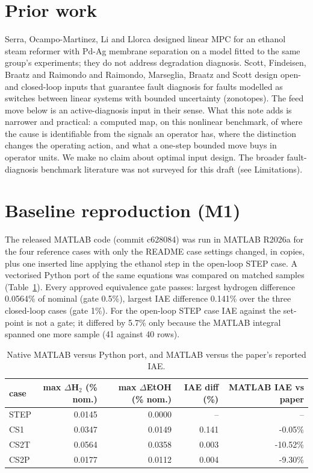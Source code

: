 \documentclass[10pt,a4paper]{article}
\begin{document}
\section{Prior work}
Serra, Ocampo-Martinez, Li and Llorca \cite{serra} designed linear MPC for an ethanol steam reformer with Pd-Ag membrane separation on a model fitted to the same group's experiments; they do not address degradation diagnosis. Scott, Findeisen, Braatz and Raimondo \cite{scott} and Raimondo, Marseglia, Braatz and Scott \cite{raimondo} design open- and closed-loop inputs that guarantee fault diagnosis for faults modelled as switches between linear systems with bounded uncertainty (zonotopes). The feed move below is an active-diagnosis input in their sense. What this note adds is narrower and practical: a computed map, on this nonlinear benchmark, of where the cause is identifiable from the signals an operator has, where the distinction changes the operating action, and what a one-step bounded move buys in operator units. We make no claim about optimal input design. The broader fault-diagnosis benchmark literature was not surveyed for this draft (see Limitations).

\section{Baseline reproduction (M1)}
The released MATLAB code (commit c628084) was run in MATLAB R2026a for the four reference cases with only the README case settings changed, in copies, plus one inserted line applying the ethanol step in the open-loop STEP case. A vectorised Python port of the same equations was compared on matched samples (Table~\ref{tab:m1}). Every approved equivalence gate passes: largest hydrogen difference 0.0564\% of nominal (gate 0.5\%), largest IAE difference 0.141\% over the three closed-loop cases (gate 1\%). For the open-loop STEP case IAE against the set-point is not a gate; it differed by 5.7\% only because the MATLAB integral spanned one more sample (41 against 40 rows).

\begin{table}[h]\centering\small
\caption{Native MATLAB versus Python port, and MATLAB versus the paper's reported IAE.}\label{tab:m1}
\begin{tabular}{lrrrr}\toprule
case & max $\Delta$H$_2$ (\% nom.) & max $\Delta$EtOH (\% nom.) & IAE diff (\%) & MATLAB IAE vs paper \\\midrule
STEP & 0.0145 & 0.0000 & -- & -- \\
CS1 & 0.0347 & 0.0149 & 0.141 & -0.05\% \\
CS2T & 0.0564 & 0.0358 & 0.003 & -10.52\% \\
CS2P & 0.0177 & 0.0112 & 0.004 & -9.30\% \\\bottomrule
\end{tabular}\end{table}
\end{document}

